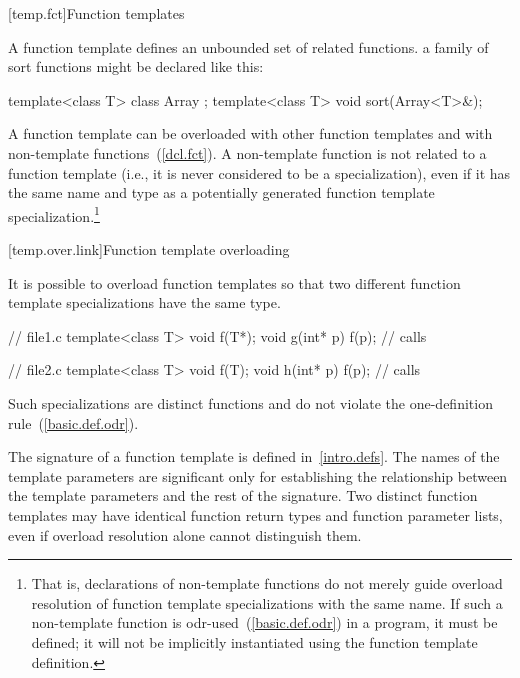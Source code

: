 [temp.fct]{Function templates}

\pnum
A function template defines an unbounded set of related functions.
\enterexample
a family of sort functions might be declared like this:

\begin{codeblock}
template<class T> class Array { };
template<class T> void sort(Array<T>&);
\end{codeblock}
\exitexample

\pnum
A function template can be overloaded with other function templates
and with non-template functions~(\ref{dcl.fct}).
A non-template function is not
related to a function template
(i.e., it is never considered to be a specialization),
even if it has the same name and type
as a potentially generated function template specialization.\footnote{That is,
declarations of non-template functions do not merely guide
overload resolution of
function template specializations
with the same name.
If such a non-template function is odr-used~(\ref{basic.def.odr}) in a program, it must be defined;
it will not be implicitly instantiated using the function template definition.}

[temp.over.link]{Function template overloading}

\pnum
{}%
It is possible to overload function templates so that two different
function template specializations have the same type.
\enterexample

\begin{minipage}{.45\hsize}
\begin{codeblock}
// file1.c
template<class T>
  void f(T*);
void g(int* p) {
  f(p); // calls 
}
\end{codeblock}
\end{minipage}
\begin{minipage}{.45\hsize}
\begin{codeblock}
// file2.c
template<class T>
  void f(T);
void h(int* p) {
  f(p); // calls 
}
\end{codeblock}
\end{minipage}

\exitexample

\pnum
Such specializations are distinct functions and do not violate the one-definition
rule~(\ref{basic.def.odr}).

\pnum
The signature of a function template
is defined in~\ref{intro.defs}.
The names of the template parameters are significant only for establishing
the relationship between the template parameters and the rest of the
signature.
\enternote
Two distinct function templates may have identical function return types and
function parameter lists, even if overload resolution alone cannot distinguish
them.

